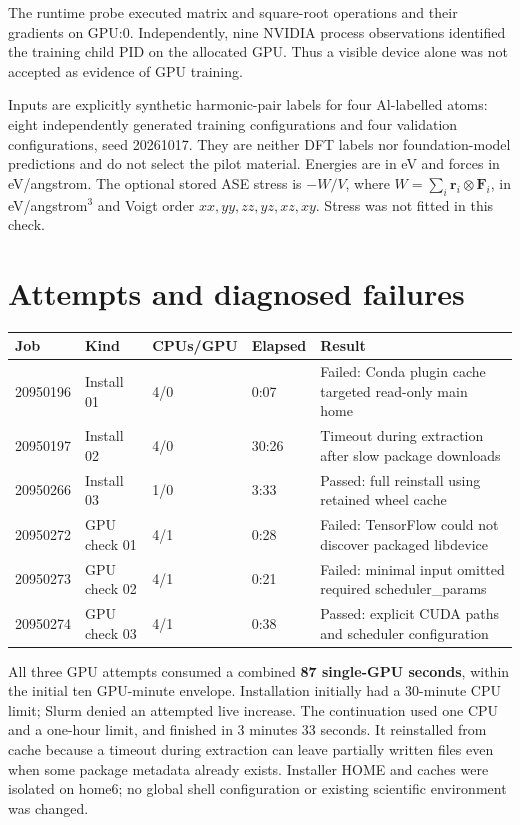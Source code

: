 \documentclass[10pt,a4paper]{article}
\begin{document}
The runtime probe executed matrix and square-root operations and their
gradients on GPU:0. Independently, nine NVIDIA process observations identified
the training child PID on the allocated GPU. Thus a visible device alone
was not accepted as evidence of GPU training.

Inputs are explicitly synthetic harmonic-pair labels for four Al-labelled
atoms: eight independently generated training configurations and four validation
configurations, seed 20261017. They are neither DFT labels nor foundation-model
predictions and do not select the pilot material. Energies are in eV and forces
in eV/angstrom. The optional stored ASE stress is $-W/V$, where
$W=\sum_i\mathbf r_i\otimes\mathbf F_i$, in eV/angstrom$^3$ and Voigt order
$xx,yy,zz,yz,xz,xy$. Stress was not fitted in this check.

\section{Attempts and diagnosed failures}
\begin{center}
\begin{tabularx}{\linewidth}{@{}llllX@{}}
\toprule
Job & Kind & CPUs/GPU & Elapsed & Result \\
\midrule
20950196 & Install 01 & 4/0 & 0:07 & Failed: Conda plugin cache targeted read-only main home \\
20950197 & Install 02 & 4/0 & 30:26 & Timeout during extraction after slow package downloads \\
20950266 & Install 03 & 1/0 & 3:33 & Passed: full reinstall using retained wheel cache \\
20950272 & GPU check 01 & 4/1 & 0:28 & Failed: TensorFlow could not discover packaged libdevice \\
20950273 & GPU check 02 & 4/1 & 0:21 & Failed: minimal input omitted required scheduler\_params \\
20950274 & GPU check 03 & 4/1 & 0:38 & Passed: explicit CUDA paths and scheduler configuration \\
\bottomrule
\end{tabularx}
\end{center}

All three GPU attempts consumed a combined \textbf{87 single-GPU seconds},
within the initial ten GPU-minute envelope. Installation initially had a
30-minute CPU limit; Slurm denied an attempted live increase. The continuation
used one CPU and a one-hour limit, and finished in 3 minutes 33 seconds.
It reinstalled from cache because a timeout during extraction can leave
partially written files even when some package metadata already exists.
Installer HOME and caches were isolated on home6; no global shell configuration
or existing scientific environment was changed.
\end{document}
